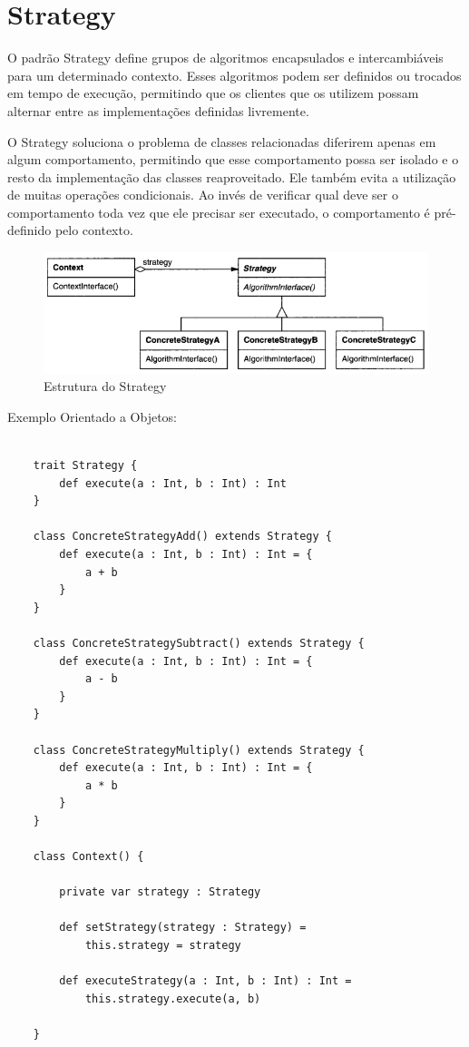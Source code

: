 \section{Strategy}

O padrão Strategy define grupos de algoritmos encapsulados e
 intercambiáveis para um determinado contexto. Esses 
 algoritmos podem ser definidos ou trocados em tempo de 
 execução, permitindo que os clientes que os utilizem possam
  alternar entre as implementações definidas livremente.

O Strategy soluciona o problema de classes relacionadas 
diferirem apenas em algum comportamento, permitindo que 
esse comportamento possa ser isolado e o resto da implementação 
das classes reaproveitado. Ele também evita a utilização de 
muitas operações condicionais. Ao invés de verificar qual 
deve ser o comportamento toda vez que ele precisar ser 
executado, o comportamento é pré-definido pelo contexto.

\begin{figure}[htb]
	\caption{\label{fig_grafico}Estrutura do Strategy}
	\begin{center}
	    \includegraphics[scale=0.5]{5_padroes-contexto-funcional/5.3_comportamentais/5.3.09_strategy/diagram.png}
	\end{center}
\end{figure}

Exemplo Orientado a Objetos:

\begin{lstlisting}[caption={Strategy Orientação a Objetos},label=oostrategy]
    
    trait Strategy {
        def execute(a : Int, b : Int) : Int
    }

    class ConcreteStrategyAdd() extends Strategy {
        def execute(a : Int, b : Int) : Int = {
            a + b
        }
    }

    class ConcreteStrategySubtract() extends Strategy {
        def execute(a : Int, b : Int) : Int = {
            a - b
        }
    }

    class ConcreteStrategyMultiply() extends Strategy {
        def execute(a : Int, b : Int) : Int = {
            a * b
        }
    }

    class Context() {
        
        private var strategy : Strategy

        def setStrategy(strategy : Strategy) =
            this.strategy = strategy

        def executeStrategy(a : Int, b : Int) : Int =
            this.strategy.execute(a, b)

    }

\end{lstlisting}


